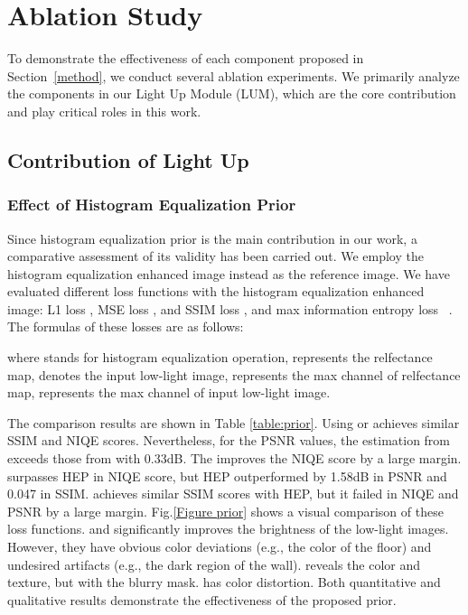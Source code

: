\documentclass[journal]{IEEEtran}
\begin{document}
\section{Ablation Study}
\label{ablation}
To demonstrate the effectiveness of each component proposed in Section~\ref{method}, we conduct several ablation experiments. We primarily analyze the components in our Light Up Module (LUM), which are the core contribution and play critical roles in this work.

\subsection{Contribution of Light Up}


\subsubsection{Effect of Histogram Equalization Prior}
Since histogram equalization prior is the main contribution in our work, a comparative assessment of its validity has been carried out. We employ the histogram equalization enhanced image instead as the reference image. We have evaluated different loss functions with the histogram equalization enhanced image: L1 loss , MSE loss , and SSIM loss , and max information entropy loss ~\cite{zhang2020self}. The formulas of these losses are as follows:




\noindent where  stands for histogram equalization operation,  represents the relfectance map,  denotes the input low-light image,  represents the max channel of relfectance map,  represents the max channel of input low-light image.

The comparison results are shown in Table \ref{table:prior}. Using  or  achieves similar SSIM and NIQE scores. Nevertheless, for the PSNR values, the estimation from  exceeds those from  with 0.33dB. The  improves the NIQE score by a large margin.  surpasses HEP in NIQE score, but HEP outperformed by 1.58dB in PSNR and 0.047 in SSIM.  achieves similar SSIM scores with HEP, but it failed in NIQE and PSNR by a large margin. Fig.\ref{Figure prior} shows a visual comparison of these loss functions.  and  significantly improves the brightness of the low-light images. However, they have obvious color deviations (e.g., the color of the floor) and undesired artifacts (e.g., the dark region of the wall).  reveals the color and texture, but with the blurry mask.  has color distortion. Both quantitative and qualitative results demonstrate the effectiveness of the proposed prior.
\end{document}
